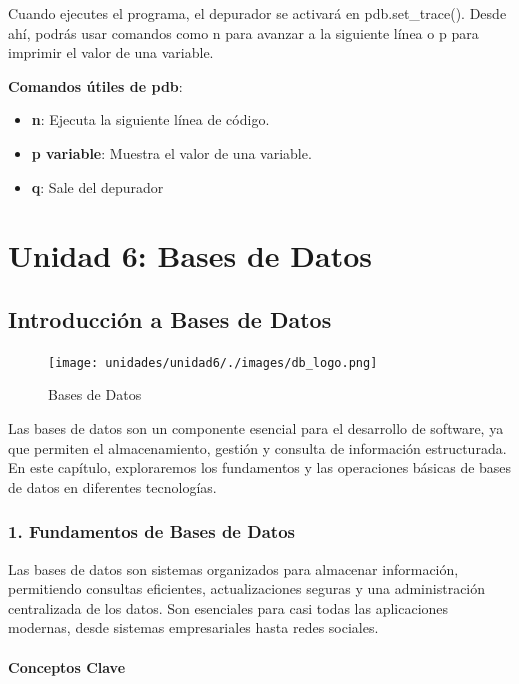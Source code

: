 \documentclass[
  a4paper,
  DIV=11,
  numbers=noendperiod,
  onepage,
  openany]{scrreprt}
\begin{document}
Cuando ejecutes el programa, el depurador se activará en
pdb.set\_trace(). Desde ahí, podrás usar comandos como n para avanzar a
la siguiente línea o p para imprimir el valor de una variable.

\textbf{Comandos útiles de pdb}:

\begin{itemize}
\item
  \textbf{n}: Ejecuta la siguiente línea de código.
\item
  \textbf{p variable}: Muestra el valor de una variable.
\item
  \textbf{q}: Sale del depurador
\end{itemize}

\part{Unidad 6: Bases de Datos}

\chapter{Introducción a Bases de
Datos}\label{introducciuxf3n-a-bases-de-datos}

\begin{figure}[H]

{\centering \texttt{[image: unidades/unidad6/./images/db\_logo.png]}

}

\caption{Bases de Datos}

\end{figure}%

Las bases de datos son un componente esencial para el desarrollo de
software, ya que permiten el almacenamiento, gestión y consulta de
información estructurada. En este capítulo, exploraremos los fundamentos
y las operaciones básicas de bases de datos en diferentes tecnologías.

\section{1. Fundamentos de Bases de
Datos}\label{fundamentos-de-bases-de-datos}

Las bases de datos son sistemas organizados para almacenar información,
permitiendo consultas eficientes, actualizaciones seguras y una
administración centralizada de los datos. Son esenciales para casi todas
las aplicaciones modernas, desde sistemas empresariales hasta redes
sociales.

\subsection{Conceptos Clave}\label{conceptos-clave-10}
\end{document}
